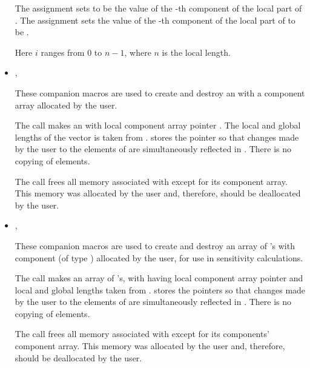 \begin{itemize}
      The assignment  sets  to be the value of 
      the -th component of the local part of . 
      The assignment    
      sets the value of the -th component of the local part of  
      to be .        

      Here $i$ ranges from $0$ to $n-1$, where $n$ is the local length.

\item {}, 

      These companion macros are used to create and          
      destroy an  with a component array         
      allocated by the user.                                   
                                                               
      The call  makes  an        
       with local component array pointer . 
      The local and global lengths of the  
      vector  is taken from .                             
       stores the pointer  so that changes      
      made by the user to the elements of  are           
      simultaneously reflected in . There is no copying of    
      elements.                                                
                                                               
      The call  frees all memory associated     
      with  except for its component array. This memory was   
      allocated by the user and, therefore, should be          
      deallocated by the user.   

\item {}, 
                             
      These companion macros are used to create and destroy  
      an array of 's with component  
      (of type ) allocated by the user, for use
      in sensitivity calculations.
                                                               
      The call  makes   
       an array of  's, with  having
      local component array pointer  and local and global lengths taken 
      from .    
       stores the pointers  so that        
      changes made by the user to the elements of  are  
      simultaneously reflected in . There is no copying of   
      elements.                                                
                                                               
      The call  frees all memory associated   
      with  except for its components' component array.      
      This memory was allocated by the user and, therefore,    
      should be deallocated by the user.                       

\end{itemize}

